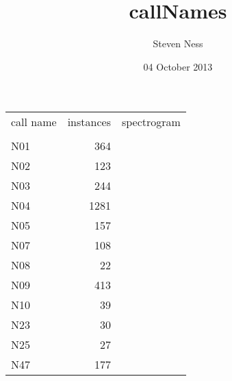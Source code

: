\documentclass[11pt,a4paper]{article}
\title{callNames}
\author{Steven Ness}
\date{04 October 2013}
\begin{document}
\maketitle

\setcounter{tocdepth}{3}
\tableofcontents

\begin{tabular}{lrl}
 call name  &  instances  &  spectrogram  \\
            &             &               \\
 N01        &        364  &               \\
 N02        &        123  &               \\
 N03        &        244  &               \\
 N04        &       1281  &               \\
 N05        &        157  &               \\
 N07        &        108  &               \\
 N08        &         22  &               \\
 N09        &        413  &               \\
 N10        &         39  &               \\
 N23        &         30  &               \\
 N25        &         27  &               \\
 N47        &        177  &               \\
\end{tabular}
\end{document}
